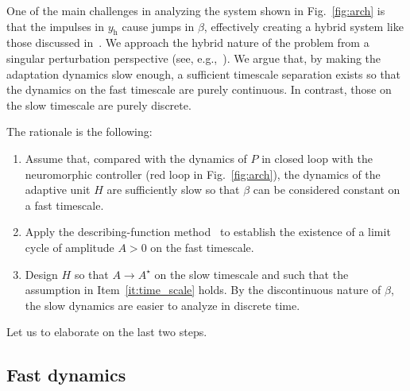 \documentclass{article}
\newcommand{\rh}{\mathrm{h}}
\theoremstyle{definition}
\theoremstyle{remark}
\begin{document}

One of the main challenges in analyzing the system shown in Fig.~\ref{fig:arch} is that the impulses in $y_\rh$ cause jumps in $\beta$, effectively creating a hybrid system like those discussed in~\cite{goebel}. We approach the hybrid nature of the problem from a singular perturbation perspective (see, e.g.,~\cite{kokotovic,khalil}). We argue that, by making the adaptation dynamics slow enough, a sufficient timescale separation exists so that the dynamics on the fast timescale are purely continuous. In contrast, those on the slow timescale are purely discrete.

The rationale is the following:
\begin{enumerate}
    \item Assume that, compared with the dynamics of $P$ in closed loop with the neuromorphic controller (red loop in Fig.~\ref{fig:arch}), the dynamics of the adaptive unit $H$ are sufficiently slow so that $\beta$ can be considered constant on a fast timescale. \label{it:time_scale}
    \item Apply the describing-function method~\cite{gelb,khalil} to establish the existence of a limit cycle of amplitude $A > 0$ on the fast timescale.
    \item Design $H$ so that $A \to A^\star$ on the slow timescale and such that the assumption in Item~\ref{it:time_scale} holds. By the discontinuous nature of $\beta$, the slow dynamics are easier to analyze in discrete time.
\end{enumerate}

Let us to elaborate on the last two steps.

\subsection{Fast dynamics}
\end{document}
